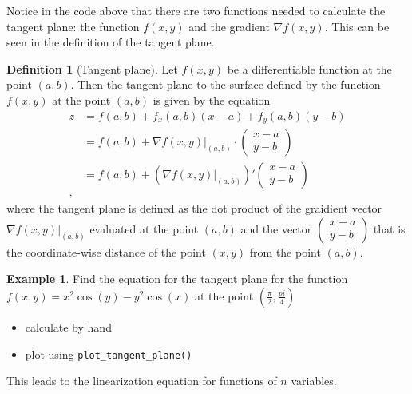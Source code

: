 \documentclass[
]{book}
\providecommand{\tightlist}{%
  \setlength{\itemsep}{0pt}\setlength{\parskip}{0pt}}
\theoremstyle{definition}
\newtheorem{definition}{Definition}[chapter]
\theoremstyle{definition}
\newtheorem{example}{Example}[chapter]
\theoremstyle{definition}
\theoremstyle{definition}
\theoremstyle{remark}
\begin{document}
Notice in the code above that there are two functions needed to calculate the tangent plane: the function \(f(x, y)\) and the gradient \(\nabla f(x, y)\). This can be seen in the definition of the tangent plane.

\begin{definition}[Tangent plane]
Let \(f(x, y)\) be a differentiable function at the point \((a, b)\). Then the tangent plane to the surface defined by the function \(f(x, y)\) at the point \((a, b)\) is given by the equation
\[
\begin{aligned}
z & = f(a, b) + f_x(a, b) (x - a) + f_y(a, b) (y - b) \\
& = f(a, b) + \nabla f(x, y) |_{(a, b)} \cdot \begin{pmatrix} x - a \\ y - b \end{pmatrix} \\
& = f(a, b) + (\nabla f(x, y) |_{ (a, b)})' \begin{pmatrix} x - a \\ y - b \end{pmatrix} \\,
\end{aligned}
\]
where the tangent plane is defined as the dot product of the graidient vector \(\nabla f(x, y) |_{(a, b)}\) evaluated at the point \((a, b)\) and the vector \(\begin{pmatrix} x - a \\ y - b \end{pmatrix}\) that is the coordinate-wise distance of the point \((x, y)\) from the point \((a, b)\).
\end{definition}

\begin{example}

Find the equation for the tangent plane for the function \(f(x, y) = x^2 \cos(y) - y^2 \cos(x)\) at the point \((\frac{\pi}{2}, \frac{pi}{4})\)

\begin{itemize}
\tightlist
\item
  calculate by hand
\item
  plot using \texttt{plot\_tangent\_plane()}
\end{itemize}

\end{example}

This leads to the linearization equation for functions of \(n\) variables.
\end{document}
